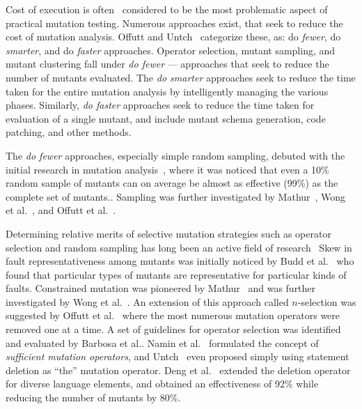 Cost of execution is often~\cite{jia2011analysis} considered 
to be the most problematic aspect of practical mutation testing.
Numerous approaches exist, that seek to reduce the cost of mutation
analysis. Offutt and Untch~\cite{offutt2001mutation} categorize these,
as: do \textit{fewer}, do \textit{smarter}, and do \textit{faster} approaches.
Operator selection, mutant sampling, and mutant clustering fall under
\textit{do fewer} --- approaches that seek to reduce the number of mutants
evaluated.  The \emph{do smarter} approaches seek to reduce the time taken
for the entire mutation analysis by intelligently managing the various phases.
Similarly, \textit{do faster} approaches seek to
reduce the time taken for evaluation of a single mutant, and include
mutant schema generation, code patching, and other methods.

The \emph{do fewer} approaches, especially simple random sampling,
debuted with the initial research in mutation
analysis~\cite{budd1980mutation,acree1980mutation}, where it was noticed that
even a 10\% random sample of mutants can on average be almost as effective (99\%)
as the complete set of mutants..
Sampling was further investigated by Mathur~\cite{mathur1991performance}, Wong et
al.~\cite{wong1993mutation,wong1995reducing}, and Offutt et al.~\cite{offutt1993experimental}.

Determining relative merits of selective mutation strategies such as operator
selection and random sampling has long been an active field of research~\cite{wong1995reducing,mresa1999efficiency,zhang2010isoperator} 
Skew in fault representativeness among mutants was initially noticed by Budd et
al.~\cite{budd1980mutation} who found that particular types of mutants are
representative for particular kinds of faults. Constrained mutation was
pioneered by Mathur~\cite{mathur1991performance,mathur1993evaluation}
and was further investigated by Wong et al.~\cite{wong1994constrained}.
An extension of this approach called $n$-selection was suggested by
Offutt et al.~\cite{offutt1993experimental} where the most numerous
mutation operators were removed one at a time. A set of guidelines for operator selection
was identified and evaluated by Barbosa et al.\cite{barbosa2001toward}.
Namin et al.~\cite{namin2006finding,namin2008sufficient} formulated the
concept of \emph{sufficient mutation operators}, and
Untch~\cite{untch2009onreduced} even proposed simply using statement
deletion as ``the'' mutation operator.  Deng et al.~\cite{deng2013empirical} extended the deletion operator for diverse
language elements, and obtained an effectiveness of 92\% while reducing the
number of mutants by 80\%.

